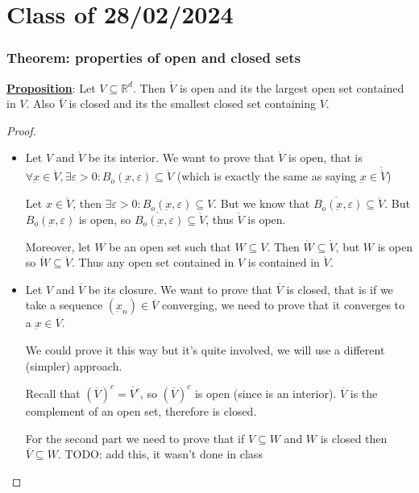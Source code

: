 \documentclass[10pt]{extarticle}
\newcommand{\R}{\mathbb{R}}
\newcommand{\munderbar}[1]{\underbar{\ensuremath{#1}}}
\newcommand{\skiplineafterproof}{$ $\par\nobreak\ignorespaces}
\begin{document}
\section{Class of 28/02/2024}

\subsubsection{Theorem: properties of open and closed sets}

\textbf{\underline{Proposition}}: Let $V \subseteq \R^d$.
Then $\mathring{V}$ is open and its the largest open set contained in $V$.
Also $\overline{V}$ is closed and its the smallest closed set containing $V$.

\begin{proof}
    \skiplineafterproof
    \begin{itemize}
        \item
              Let $V$ and $\mathring V$ be its interior. We want to prove that $\mathring V$ is open, that is $\forall \munderbar{x} \in \mathring V, \exists \varepsilon > 0 : B_o(\munderbar{x}, \varepsilon) \subseteq \mathring V$ (which is exactly the same as saying $\munderbar{x} \in \mathring{\mathring{V}}$)

              Let $x \in \mathring V$, then $\exists \varepsilon > 0 : B_o(\munderbar{x}, \varepsilon) \subseteq V$.
              But we know that $\mathring{B_o(\munderbar{x}, \varepsilon)} \subseteq \mathring{V}$.
              But $B_o(\munderbar{x}, \varepsilon)$ is open, so $\mathring{B_o(\munderbar{x}, \varepsilon)} \subseteq \mathring{V}$, thus $\mathring{V}$ is open.

              Moreover, let $W$ be an open set such that $W \subseteq V$.
              Then $\mathring{W} \subseteq \mathring{V}$, but $W$ is open so $\mathring{W} \subseteq \mathring{V}$. Thus any open set contained in $V$ is contained in $\mathring{V}$.

        \item
              Let $V$ and $\overline V$ be its closure. We want to prove that $\overline V$ is closed, that is if we take a sequence $\left(\munderbar{x}_n\right) \in \overline{V}$ converging, we need to prove that it converges to a $\munderbar{x} \in \overline V$.

              We could prove it this way but it's quite involved, we will use a different (simpler) approach.

              Recall that $\left(\overline{V}\right)^c = \mathring{V^c}$, so $\left(\overline{V}\right)^c$ is open (since is an interior).
              $\overline{V}$ is the complement of an open set, therefore is closed.

              For the second part we need to prove that if $V \subseteq W$ and $W$ is closed then $\overline{V} \subseteq W$.
              TODO: add this, it wasn't done in class
    \end{itemize}
\end{proof}
\end{document}
